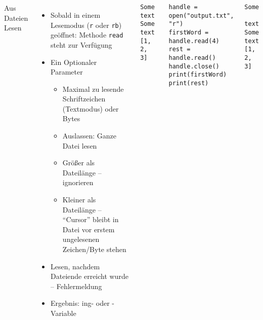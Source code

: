 \begin{frame}[fragile]
%
\begin{columns}[T]
\begin{Large}
	{Aus Dateien Lesen}
	\vspace{6pt}
\end{Large}
\begin{itemize}
\item Sobald in einem Lesemodus (\texttt{r} oder \texttt{rb}) geöffnet: Methode \texttt{read} steht zur Verfügung
\item Ein Optionaler Parameter
	\begin{itemize}
	\item Maximal zu lesende Schriftzeichen (Textmodus) oder Bytes
	\item Auslassen: Ganze Datei lesen
	\item Größer als Dateilänge -- ignorieren
	\item Kleiner als Dateilänge -- \enquote{Cursor} bleibt in Datei vor erstem ungelesenen Zeichen/Byte stehen
	\end{itemize}
\item Lesen, nachdem Dateiende erreicht wurde -- Fehlermeldung
\item Ergebnis: ing- oder -Variable
\end{itemize}
%
\begin{cmdbox}
\begin{verbatim}
Some text Some text
[1, 2, 3]
\end{verbatim}
\end{cmdbox}
%
\begin{codebox}
\begin{verbatim}
handle = open("output.txt", "r")
firstWord = handle.read(4)
rest = handle.read()
handle.close()
print(firstWord)
print(rest)
\end{verbatim}
\end{codebox}
%
\begin{cmdbox}[Ausgabe]
\begin{verbatim}
Some
 text Some text
[1, 2, 3]
\end{verbatim}
\end{cmdbox}
%
\end{columns}
%
\end{frame}



